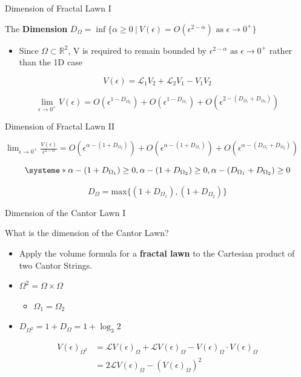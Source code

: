 \documentclass{if-beamer}
\newcommand{\R}{\mathbb{R}}
\newcommand{\SL}{\mathcal{L}}
\newcommand{\Om}{\Omega}
\begin{document}
\begin{frame}{Dimension of Fractal Lawn I}

\begin{definition}
	The {\bf Dimension} $D_{\Om} = \inf\{\alpha \geq 0\ |\ V(\epsilon) = O(\epsilon^{2 - \alpha})\text{ as }\epsilon \to 0^+\}$
\end{definition}
\pause
\begin{itemize}
	\item Since $\Om \subset \R^2$, V is required to remain bounded by $\epsilon^{2-\alpha} \text{ as }\epsilon \to 0^+ $ rather than the 1D case   
\end{itemize}
\pause
\vspace{0.2in}

	\[ V(\epsilon) = \SL_1 V_2 + \SL_2 V_1 - V_1 V_2 \]
	\pause
	
	\[ \lim_{\epsilon \to 0^+} V(\epsilon) = O(\epsilon^{1-D_{\Om_2}}) + O(\epsilon^{1-D_{\Om_1}}) + O(\epsilon^{2-(D_{\Om_1} + D_{\Om_2})})  \]
	
\end{frame}

\begin{frame}{Dimension of Fractal Lawn II}

$\displaystyle \lim_{\epsilon \to 0^+} \frac{V(\epsilon)}{\epsilon^{2-\alpha}} = O(\epsilon^{\alpha - (1+D_{\Om_2})}) + O(\epsilon^{\alpha - (1+D_{\Om_1})}) + O(\epsilon^{\alpha - (D_{\Om_1} + D_{\Om_2})})$
\pause

\[ 
\systeme*{\alpha - (1 + D_{\Om_1}) \geq 0, \alpha - (1 + D_{\Om_2}) \geq 0, \alpha - (D_{\Om_1} + D_{\Om_2}) \geq 0}
\]
\pause

\[ 
D_{\Om} = \text{max} \{ (1 + D_{\Om_1}), (1 + D_{\Om_2}) \}
\]

\end{frame}

\begin{frame}{Dimension of the Cantor Lawn I}

What is the dimension of the Cantor Lawn? \\
\pause
\begin{itemize}
\item Apply the volume formula for a {\bf fractal lawn} to the Cartesian product of two Cantor Strings.
\pause 

\item $\Om^2 = \Om \times \Om $
	\pause
	\begin{itemize}
	\item $\Om_1 = \Om_2 $
	\end{itemize}
\pause

\item $D_{\Om^2} = 1 + D_{\Om} = 1 + \log_3 2 $
\end{itemize}
\pause

\begin{align*}
V(\epsilon)_{\Om^2} &= \SL V(\epsilon)_{\Om} + \SL V(\epsilon)_{\Om} - V(\epsilon)_{\Om} \cdot V(\epsilon)_{\Om} \\
&= 2 \SL V(\epsilon)_{\Om} - (V(\epsilon)_{\Om})^2
\end{align*}

\end{frame}
\end{document}
